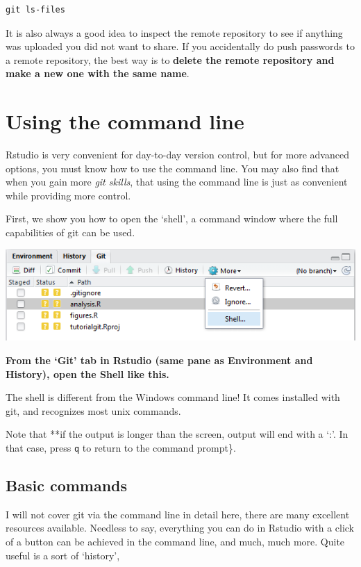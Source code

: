 \documentclass[]{book}
\begin{document}
\begin{verbatim}
git ls-files
\end{verbatim}

It is also always a good idea to inspect the remote repository to see if anything was uploaded you did not want to share. If you accidentally do push passwords to a remote repository, the best way is to \textbf{delete the remote repository and make a new one with the same name}.

\hypertarget{commandline}{%
\section{Using the command line}\label{commandline}}

Rstudio is very convenient for day-to-day version control, but for more advanced options, you must know how to use the command line. You may also find that when you gain more \emph{git skills}, that using the command line is just as convenient while providing more control.

First, we show you how to open the `shell', a command window where the full capabilities of git can be used.

\includegraphics[width=0.75\linewidth]{screenshots/openshell}

\textbf{From the `Git' tab in Rstudio (same pane as Environment and History), open the Shell like this.}

The shell is different from the Windows command line! It comes installed with git, and recognizes most unix commands.

Note that **if the output is longer than the screen, output will end with a `:'. In that case, press \texttt{q} to return to the command prompt\}.

\hypertarget{basic-commands}{%
\subsection{Basic commands}\label{basic-commands}}

I will not cover git via the command line in detail here, there are many excellent resources available. Needless to say, everything you can do in Rstudio with a click of a button can be achieved in the command line, and much, much more. Quite useful is a sort of `history',
\end{document}
